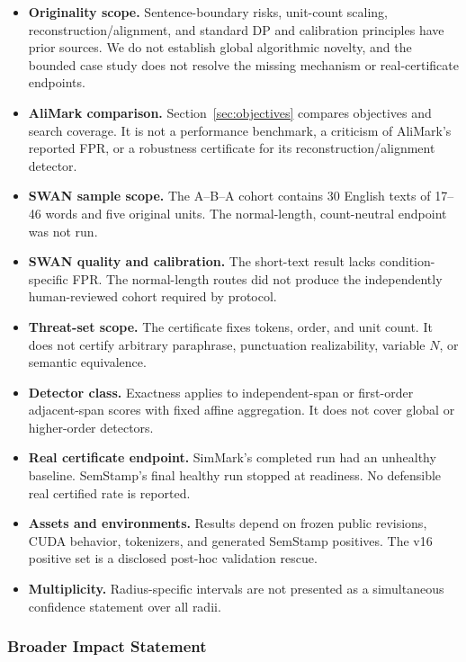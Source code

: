 \documentclass[10pt]{article}
\begin{document}
\begin{itemize}
  \item \textbf{Originality scope.} Sentence-boundary risks, unit-count
  scaling, reconstruction/alignment, and standard DP and calibration
  principles have prior sources. We do not establish global algorithmic
  novelty, and the bounded case study does not resolve the missing
  mechanism or real-certificate endpoints.
  \item \textbf{AliMark comparison.} Section~\ref{sec:objectives} compares
  objectives and search coverage. It is not a performance benchmark, a
  criticism of AliMark's reported FPR, or a robustness certificate for its
  reconstruction/alignment detector.
  \item \textbf{SWAN sample scope.} The A--B--A cohort contains 30 English
  texts of 17--46 words and five original units. The normal-length,
  count-neutral endpoint was not run.
  \item \textbf{SWAN quality and calibration.} The short-text result lacks
  condition-specific FPR. The normal-length routes did not produce the
  independently human-reviewed cohort required by protocol.
  \item \textbf{Threat-set scope.} The certificate fixes tokens, order, and
  unit count. It does not certify arbitrary paraphrase, punctuation
  realizability, variable $N$, or semantic equivalence.
  \item \textbf{Detector class.} Exactness applies to independent-span or
  first-order adjacent-span scores with fixed affine aggregation. It does not
  cover global or higher-order detectors.
  \item \textbf{Real certificate endpoint.} SimMark's completed run had an
  unhealthy baseline. SemStamp's final healthy run stopped at readiness.
  No defensible real certified rate is reported.
  \item \textbf{Assets and environments.} Results depend on frozen public
  revisions, CUDA behavior, tokenizers, and generated SemStamp positives.
  The v16 positive set is a disclosed post-hoc validation rescue.
  \item \textbf{Multiplicity.} Radius-specific intervals are not presented as
  a simultaneous confidence statement over all radii.
\end{itemize}

\subsubsection*{Broader Impact Statement}
\end{document}
